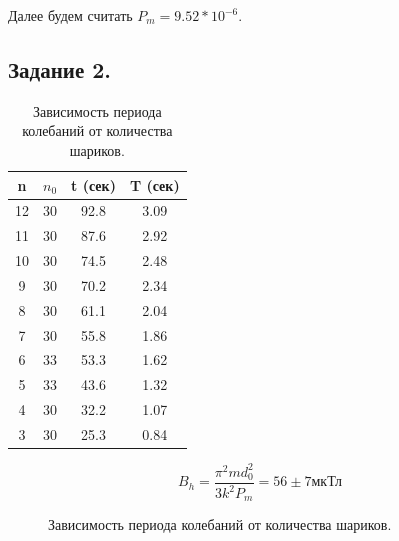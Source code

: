 \documentclass[a4paper,12pt]{article} %
\begin{document}
Далее будем считать $P_m = 9.52 * 10^{-6}$. 

\subsection{Задание 2.}

\begin{table}[H]
\caption{\label{tab:canonsummary} Зависимость периода колебаний от количества шариков.}
\begin{center}
\begin{tabular}{|c|c|c|c|}
\hline
n & $n_0$ & t (сек) & T (сек)\\
\hline
12 & 30 & 92.8 & 3.09\\
\hline
11 & 30 & 87.6 & 2.92\\
\hline
10 & 30 & 74.5 & 2.48\\
\hline
9 & 30 & 70.2 & 2.34\\
\hline
8 & 30 & 61.1 & 2.04\\
\hline
7 & 30 & 55.8 & 1.86\\
\hline
6 & 33 & 53.3 & 1.62\\
\hline
5 & 33 & 43.6 & 1.32\\
\hline
4 & 30 & 32.2 & 1.07\\
\hline
3 & 30 & 25.3 & 0.84\\
\hline
\end{tabular}
\end{center}
\label{table1:ref}
\end{table}

\begin{equation}\label{eq11}
B_h = \frac{\pi^2 m d_0^2}{3 k^2 P_m} = 56 \pm 7\text{мкТл}
\end{equation}

\begin{figure}[H]
\noindent{}
\caption{Зависимость периода колебаний от количества шариков.}
\label{pic4:ref}
\end{figure}
\end{document}
